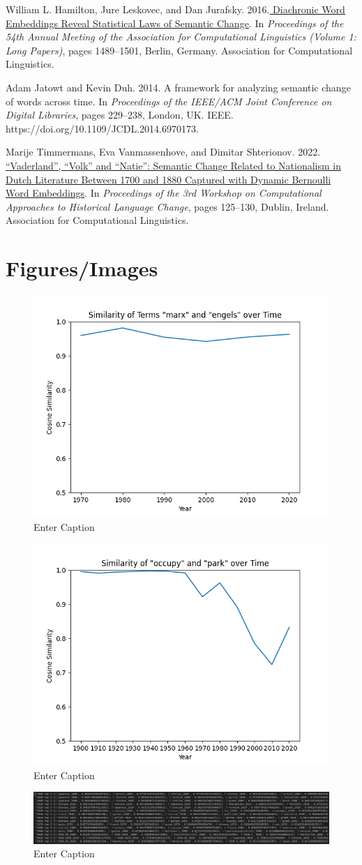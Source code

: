 \documentclass[11pt]{article}
\begin{document}
William L. Hamilton, Jure Leskovec, and Dan Jurafsky. 2016.\href{https://aclanthology.org/P16-1141}{ Diachronic Word Embeddings Reveal Statistical Laws of Semantic Change}. In \textit{Proceedings of the 54th Annual Meeting of the Association for Computational Linguistics (Volume 1: Long Papers)}, pages 1489–1501, Berlin, Germany. Association for Computational Linguistics.

Adam Jatowt and Kevin Duh. 2014. A framework for analyzing semantic change of words across time. In \textit{Proceedings of the IEEE/ACM Joint Conference on Digital Libraries}, pages 229–238, London, UK. IEEE. https://doi.org/10.1109/JCDL.2014.6970173.

Marije Timmermans, Eva Vanmassenhove, and Dimitar Shterionov. 2022.\href{https://aclanthology.org/2022.lchange-1.13}{ “Vaderland”, “Volk” and “Natie”: Semantic Change Related to Nationalism in Dutch Literature Between 1700 and 1880 Captured with Dynamic Bernoulli Word Embeddings}. In \textit{Proceedings of the 3rd Workshop on Computational Approaches to Historical Language Change}, pages 125–130, Dublin, Ireland. Association for Computational Linguistics.


\section*{Figures/Images}
\begin{figure}
    \centering
    \includegraphics[width=0.5\linewidth]{marx-engels.png}
    \caption{Enter Caption}
    \label{Figure 1}
\end{figure}
\begin{figure}
    \centering
    \includegraphics[width=0.5\linewidth]{occupy-park.png}
    \caption{Enter Caption}
    \label{Figure 2}
\end{figure}
\begin{figure}
    \centering
    \includegraphics[width=0.5\linewidth]{spanish.png}
    \caption{Enter Caption}
    \label{Image 1}
\end{figure}
\end{document}
